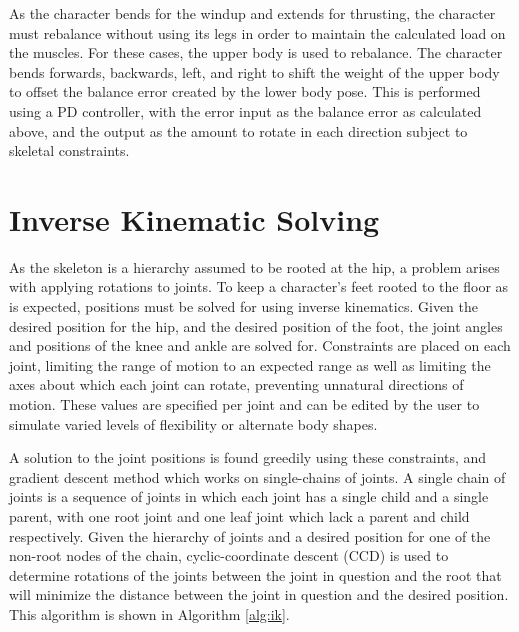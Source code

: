 
As the character bends for the windup and extends for thrusting, the character must rebalance without using its legs in order to maintain the calculated load on the muscles.  For these cases, the upper body is used to rebalance.  The character bends forwards, backwards, left, and right to shift the weight of the upper body to offset the balance error created by the lower body pose.  This is performed using a PD controller, with the error input as the balance error as calculated above, and the output as the amount to rotate in each direction subject to skeletal constraints.

\section{Inverse Kinematic Solving}
\label{section:ik}
As the skeleton is a hierarchy assumed to be rooted at the hip, a problem arises with applying rotations to joints.  To keep a character's feet rooted to the floor as is expected, positions must be solved for using inverse kinematics.  Given the desired position for the hip, and the desired position of the foot, the joint angles and positions of the knee and ankle are solved for.  Constraints are placed on each joint, limiting the range of motion to an expected range as well as limiting the axes about which each joint can rotate, preventing unnatural directions of motion.  These values are specified per joint and can be edited by the user to simulate varied levels of flexibility or alternate body shapes.



A solution to the joint positions is found greedily using these constraints, and gradient descent method which works on single-chains of joints.  A single chain of joints is a sequence of joints in which each joint has a single child and a single parent, with one root joint and one leaf joint which lack a parent and child respectively.  Given the hierarchy of joints and a desired position for one of the non-root nodes of the chain, cyclic-coordinate descent (CCD) is used to determine rotations of the joints between the joint in question and the root that will minimize the distance between the joint in question and the desired position.  This algorithm is shown in Algorithm \ref{alg:ik}.


